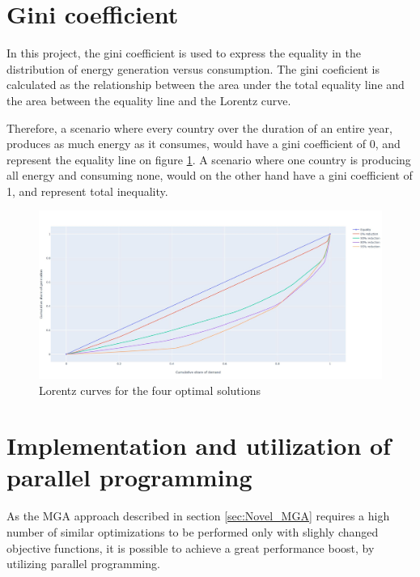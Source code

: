 
\section{Gini coefficient}

In this project, the gini coefficient is used to express the equality in the distribution of energy generation versus consumption. The gini coeficient is calculated as the relationship between the area under the total equality line and the area between the equality line and the Lorentz curve. 

Therefore, a scenario where every country over the duration of an entire year, produces as much energy as it consumes, would have a gini coefficient of 0, and represent the equality line on figure \ref{fig:Gini}. A scenario where one country is producing all energy and consuming none, would on the other hand have a gini coefficient of 1, and represent total inequality. 

\begin{figure}[h]\centering
	\includegraphics[width=1.\textwidth]{./Images/optimal_solutions_gini}
	\caption{Lorentz curves for the four optimal solutions }
	\label{fig:Gini}
\end{figure}


\section{Implementation and utilization of parallel programming}
As the MGA approach described in section \ref{sec:Novel_MGA} requires a high number of similar optimizations to be performed only with slighly changed objective functions, it is possible to achieve a great performance boost, by utilizing parallel programming. 




